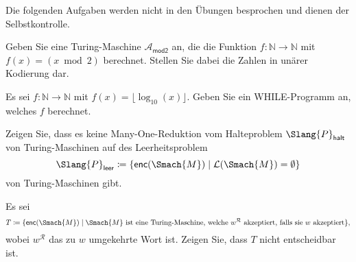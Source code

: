 \documentclass[german]{latteachCD}[2017/03/28]
\begin{document}
\maketitle

\enlargethispage{2\baselineskip}

\begin{mdframed}
  Die folgenden Aufgaben werden nicht in den Übungen besprochen und dienen der
  Selbstkontrolle.

  \renewcommand{\theexercise}{\Alph{exercise}}
  \setcounter{exercise}{4}

  \begin{exercise}
    Geben Sie eine Turing-Maschine $\mathcal{A}_{\mathsf{mod2}}$ an, die die
    Funktion $f\colon \mathbb N \to \mathbb N$ mit $f(x) = (x \bmod 2)$
    berechnet.  Stellen Sie dabei die Zahlen in unärer Kodierung dar.
  \end{exercise}

  \begin{exercise}
    Es sei $f \colon \mathbb N \to \mathbb N$ mit $f(x) = \lfloor
    \log_{10}(x)\rfloor$.  Geben Sie ein WHILE-Programm an, welches $f$
    berechnet.
  \end{exercise}
  \vspace*{-0.5\baselineskip}
\end{mdframed}

\vspace*{0.5\baselineskip}

\setcounter{exercise}{0}

\begin{exercise}
  Zeigen Sie, dass es keine Many-One-Reduktion vom Halteproblem
  $\Slang{P}_{\mathsf{halt}}$ von Turing-Maschinen auf des Leerheitsproblem
  \begin{equation*}
    \Slang{P}_{\mathsf{leer}} \coloneqq \{ \mathsf{enc}(\Smach{M}) \mid
    \mathcal{L}(\Smach{M}) = \emptyset \}
  \end{equation*}
  von Turing-Maschinen gibt.
\end{exercise}

\begin{exercise}
  Es sei
  \begin{equation*}
    T \coloneqq \{ \mathsf{enc}(\Smach{M}) \mid \Smach{M} \text{ ist eine Turing-Maschine,
      welche $w^{\mathcal{R}}$ akzeptiert, falls sie $w$ akzeptiert}\},
  \end{equation*}
  wobei $w^{\mathcal{R}}$ das zu $w$ umgekehrte Wort ist.  Zeigen Sie, dass $T$
  nicht entscheidbar ist.
\end{exercise}
\end{document}
